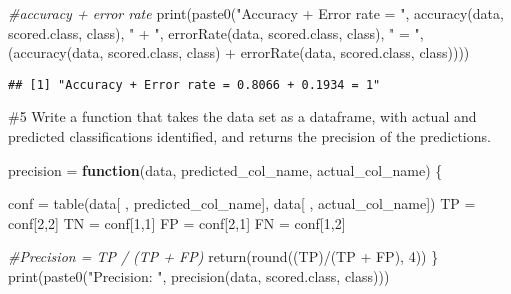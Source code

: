 \documentclass[
]{article}
\newenvironment{Shaded}{\begin{snugshade}}{\end{snugshade}}
\newcommand{\CommentTok}[1]{\textcolor[rgb]{0.56,0.35,0.01}{\textit{#1}}}
\newcommand{\ControlFlowTok}[1]{\textcolor[rgb]{0.13,0.29,0.53}{\textbf{#1}}}
\newcommand{\DecValTok}[1]{\textcolor[rgb]{0.00,0.00,0.81}{#1}}
\newcommand{\FunctionTok}[1]{\textcolor[rgb]{0.00,0.00,0.00}{#1}}
\newcommand{\NormalTok}[1]{#1}
\newcommand{\OtherTok}[1]{\textcolor[rgb]{0.56,0.35,0.01}{#1}}
\newcommand{\SpecialCharTok}[1]{\textcolor[rgb]{0.00,0.00,0.00}{#1}}
\newcommand{\StringTok}[1]{\textcolor[rgb]{0.31,0.60,0.02}{#1}}
\begin{document}
\begin{Shaded}
\begin{Highlighting}[]
\CommentTok{\#accuracy + error rate}
\FunctionTok{print}\NormalTok{(}\FunctionTok{paste0}\NormalTok{(}\StringTok{"Accuracy + Error rate = "}\NormalTok{, }\FunctionTok{accuracy}\NormalTok{(data, }\StringTok{\textquotesingle{}scored.class\textquotesingle{}}\NormalTok{, }\StringTok{\textquotesingle{}class\textquotesingle{}}\NormalTok{), }\StringTok{" + "}\NormalTok{, }\FunctionTok{errorRate}\NormalTok{(data, }\StringTok{\textquotesingle{}scored.class\textquotesingle{}}\NormalTok{, }\StringTok{\textquotesingle{}class\textquotesingle{}}\NormalTok{), }\StringTok{" = "}\NormalTok{, (}\FunctionTok{accuracy}\NormalTok{(data, }\StringTok{\textquotesingle{}scored.class\textquotesingle{}}\NormalTok{, }\StringTok{\textquotesingle{}class\textquotesingle{}}\NormalTok{) }\SpecialCharTok{+} \FunctionTok{errorRate}\NormalTok{(data, }\StringTok{\textquotesingle{}scored.class\textquotesingle{}}\NormalTok{, }\StringTok{\textquotesingle{}class\textquotesingle{}}\NormalTok{))))}
\end{Highlighting}
\end{Shaded}

\begin{verbatim}
## [1] "Accuracy + Error rate = 0.8066 + 0.1934 = 1"
\end{verbatim}

\#5 Write a function that takes the data set as a dataframe, with actual
and predicted classifications identified, and returns the precision of
the predictions.

\begin{Shaded}
\begin{Highlighting}[]
\NormalTok{precision }\OtherTok{=} \ControlFlowTok{function}\NormalTok{(data, predicted\_col\_name, actual\_col\_name) \{}
  
\NormalTok{  conf }\OtherTok{=} \FunctionTok{table}\NormalTok{(data[ , predicted\_col\_name], data[ , actual\_col\_name])}
\NormalTok{  TP }\OtherTok{=}\NormalTok{ conf[}\DecValTok{2}\NormalTok{,}\DecValTok{2}\NormalTok{]}
\NormalTok{  TN }\OtherTok{=}\NormalTok{ conf[}\DecValTok{1}\NormalTok{,}\DecValTok{1}\NormalTok{]}
\NormalTok{  FP }\OtherTok{=}\NormalTok{ conf[}\DecValTok{2}\NormalTok{,}\DecValTok{1}\NormalTok{]}
\NormalTok{  FN }\OtherTok{=}\NormalTok{ conf[}\DecValTok{1}\NormalTok{,}\DecValTok{2}\NormalTok{]}
  
  \CommentTok{\#Precision = TP / (TP + FP)}
  \FunctionTok{return}\NormalTok{(}\FunctionTok{round}\NormalTok{((TP)}\SpecialCharTok{/}\NormalTok{(TP }\SpecialCharTok{+}\NormalTok{ FP), }\DecValTok{4}\NormalTok{))}
\NormalTok{\}}
\FunctionTok{print}\NormalTok{(}\FunctionTok{paste0}\NormalTok{(}\StringTok{"Precision: "}\NormalTok{, }\FunctionTok{precision}\NormalTok{(data, }\StringTok{\textquotesingle{}scored.class\textquotesingle{}}\NormalTok{, }\StringTok{\textquotesingle{}class\textquotesingle{}}\NormalTok{)))}
\end{Highlighting}
\end{Shaded}
\end{document}
